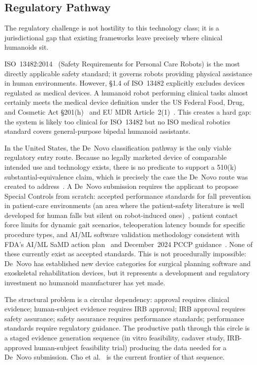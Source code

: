 \subsection{Regulatory Pathway}
\label{sec:regulatory}

The regulatory challenge is not hostility to this technology class; it is a
jurisdictional gap that existing frameworks leave precisely where clinical
humanoids sit.

ISO~13482:2014~\cite{iso13482} (Safety Requirements for Personal Care Robots) is
the most directly applicable safety standard; it governs robots providing
physical assistance in human environments. However, \S{}1.4 of ISO~13482
explicitly excludes devices regulated as medical devices. A humanoid robot performing
clinical tasks almost certainly meets the medical device definition under the US
Federal Food, Drug, and Cosmetic Act \S{}201(h)~\cite{fdcact201h} and EU MDR
Article~2(1)~\cite{eumdr2017}. This creates a hard gap: the system
is likely too clinical for ISO~13482 but no ISO medical robotics standard covers
general-purpose bipedal humanoid assistants.

In the United States, the De~Novo classification pathway is the only viable
regulatory entry route. Because no legally marketed device of comparable
intended use and technology exists, there is no predicate to support a 510(k)
substantial-equivalence claim, which is precisely the case the De~Novo route was
created to address~\cite{fda2021denovo}. A De~Novo submission requires
the applicant to propose Special Controls from scratch: accepted performance
standards for fall prevention in patient-care environments (an area where the
patient-safety literature is well developed for human falls but silent on
robot-induced ones)~\cite{oliver2007strategies,cameron2012interventions}, patient
contact force limits for dynamic gait scenarios, teleoperation latency bounds for specific
procedure types, and AI/ML software validation methodology consistent with FDA's
AI/ML SaMD action plan~\cite{fda2021aiml} and December~2024 PCCP
guidance~\cite{fda2024pccp}. None of these currently exist as accepted standards. This is not procedurally
impossible: De~Novo has established new device categories for surgical planning
software and exoskeletal rehabilitation devices, but it represents a development
and regulatory investment no humanoid manufacturer has yet made.

The structural problem is a circular dependency: approval requires clinical
evidence; human-subject evidence requires IRB approval; IRB approval requires
safety assurance; safety assurance requires performance standards; performance
standards require regulatory guidance. The productive path through this circle is
a staged evidence generation sequence (in vitro feasibility, cadaver study,
IRB-approved human-subject feasibility trial) producing the data needed for a
De~Novo submission. Cho et al.~\cite{cho2026humanoid} is the current frontier of
that sequence.

